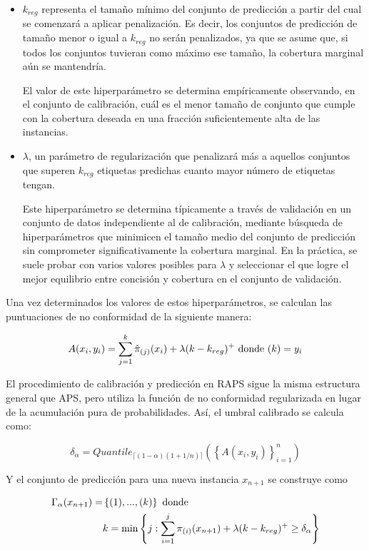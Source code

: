 \begin{itemize}

    \item $k_{reg}$ representa el tamaño mínimo del conjunto de predicción a partir del cual se comenzará a aplicar penalización. Es decir, los conjuntos de predicción de tamaño menor o igual a $k_{reg}$ no serán penalizados, ya que se asume que, si todos los conjuntos tuvieran como máximo ese tamaño, la cobertura marginal aún se mantendría. 
    
    El valor de este hiperparámetro se determina empíricamente observando, en el conjunto de calibración, cuál es el menor tamaño de conjunto que cumple con la cobertura deseada en una fracción suficientemente alta de las instancias. 
   
    \item $\lambda$, un parámetro de regularización que penalizará más a aquellos conjuntos que superen $k_{reg}$ etiquetas predichas cuanto mayor número de etiquetas tengan. 

    Este hiperparámetro se determina típicamente a través de validación en un conjunto de datos independiente al de calibración, mediante búsqueda de hiperparámetros que minimicen el tamaño medio del conjunto de predicción sin comprometer significativamente la cobertura marginal. En la práctica, se suele probar con varios valores posibles para $\lambda$ y seleccionar el que logre el mejor equilibrio entre concisión y cobertura en el conjunto de validación.

\end{itemize}

Una vez determinados los valores de estos hiperparámetros, se calculan las puntuaciones de no conformidad de la siguiente manera:

$$
A(x_i, y_i) = \sum_{j=1}^k \hat{\pi}_{(j)}(x_i) + \lambda (k-k_{reg})^+ \textnormal{ donde } (k) = y_i
$$

El procedimiento de calibración y predicción en \acrshort{RAPS} sigue la misma estructura general que \acrshort{APS}, pero utiliza la función de no conformidad regularizada en lugar de la acumulación pura de probabilidades. Así, el umbral calibrado se calcula como:

$$
\delta_\alpha = Quantile_{ \lceil  (1-\alpha) (1 + 1/n)  \rceil } \left( \left\{ A(x_i,y_i) \right\}_{i=1}^n \right)
$$

Y el conjunto de predicción para una nueva instancia $x_{n+1}$ se construye como

\begin{align*} 
\Gamma_\alpha(x_{n+1})= &\left\{ (1), ..., (k) \right\} \textnormal{ donde }\\
& k = \min \left\{ j: \sum_{i=1}^{j} \pi_{(i)}(x_{n+1}) + \lambda (k-k_{reg})^+  \ge \delta_\alpha \right\}
\end{align*}

